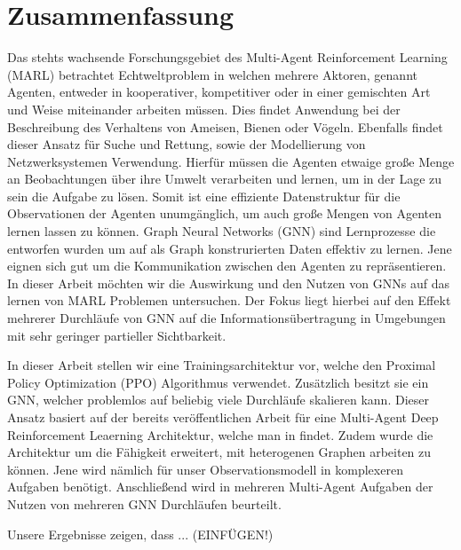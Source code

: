 
\chapter*{Zusammenfassung}

Das stehts wachsende Forschungsgebiet des Multi-Agent Reinforcement Learning (MARL) betrachtet Echtweltproblem in welchen mehrere Aktoren, genannt Agenten, entweder in kooperativer, kompetitiver oder in einer gemischten Art und Weise miteinander arbeiten müssen. Dies findet Anwendung bei der Beschreibung des Verhaltens von Ameisen, Bienen oder Vögeln. Ebenfalls findet dieser Ansatz für Suche und Rettung, sowie der Modellierung von Netzwerksystemen Verwendung. Hierfür müssen die Agenten etwaige große Menge an Beobachtungen über ihre Umwelt verarbeiten und lernen, um in der Lage zu sein die Aufgabe zu lösen. Somit ist eine effiziente Datenstruktur für die Observationen der Agenten unumgänglich, um auch große Mengen von Agenten lernen lassen zu können. 
Graph Neural Networks (GNN) sind Lernprozesse die entworfen wurden um auf als Graph konstrurierten Daten effektiv zu lernen. Jene eignen sich gut um die Kommunikation zwischen den Agenten zu repräsentieren. In dieser Arbeit möchten wir die Auswirkung und den Nutzen von GNNs auf das lernen von MARL Problemen untersuchen. Der Fokus liegt hierbei auf den Effekt mehrerer Durchläufe von GNN auf die Informationsübertragung in Umgebungen mit sehr geringer partieller Sichtbarkeit.\par

In dieser Arbeit stellen wir eine Trainingsarchitektur vor, welche den Proximal Policy Optimization (PPO) Algorithmus verwendet. Zusätzlich besitzt sie ein GNN, welcher problemlos auf beliebig viele Durchläufe skalieren kann. Dieser Ansatz basiert auf der bereits veröffentlichen Arbeit für eine Multi-Agent Deep Reinforcement Leaerning Architektur, welche man in \citet{RobinRuede2021} findet. Zudem wurde die Architektur um die Fähigkeit erweitert, mit heterogenen Graphen arbeiten zu können. Jene wird nämlich für unser Observationsmodell in komplexeren Aufgaben benötigt. Anschließend wird in mehreren Multi-Agent Aufgaben der Nutzen von mehreren GNN Durchläufen beurteilt.\par

Unsere Ergebnisse zeigen, dass ... (EINFÜGEN!)